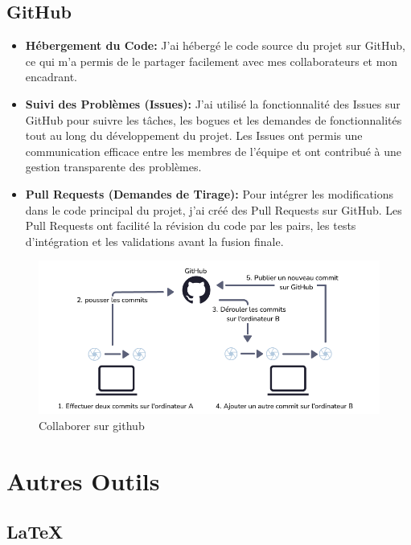 
\subsection{GitHub}

\begin{itemize}
  \item \textbf{Hébergement du Code: }J'ai hébergé le code source du projet sur GitHub, ce qui m'a permis de le partager facilement avec mes collaborateurs et mon encadrant.
  \item \textbf{Suivi des Problèmes (Issues): }J'ai utilisé la fonctionnalité des Issues sur GitHub pour suivre les tâches, les bogues et les demandes de fonctionnalités tout au long du développement du projet. Les Issues ont permis une communication efficace entre les membres de l'équipe et ont contribué à une gestion transparente des problèmes.
  \item \textbf{Pull Requests (Demandes de Tirage): }Pour intégrer les modifications dans le code principal du projet, j'ai créé des Pull Requests sur GitHub. Les Pull Requests ont facilité la révision du code par les pairs, les tests d'intégration et les validations avant la fusion finale.
\end{itemize}

\begin{figure}[H] 
    \centering
    \includegraphics[width=18cm]{Figures/github.png}
    \caption{Collaborer sur github}
\end{figure}

\section{Autres Outils}

\subsection{\LaTeX}

